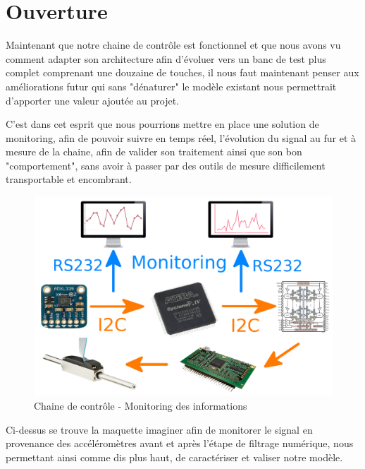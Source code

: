 \documentclass[french,a4paper,12pt]{report}
\begin{document}
		\section{Ouverture}
		
		Maintenant que notre chaine de contrôle est fonctionnel et que nous avons vu comment adapter son architecture afin d'évoluer vers un banc de test plus complet comprenant une douzaine de touches, il nous faut maintenant penser aux améliorations futur qui sans "dénaturer" le modèle existant nous permettrait d'apporter une valeur ajoutée au projet.
		
		C'est dans cet esprit que nous pourrions mettre en place une solution de monitoring, afin de pouvoir suivre en temps réel, l'évolution du signal au fur et à mesure de la chaine, afin de valider son traitement ainsi que son bon "comportement", sans avoir à passer par des outils de mesure difficilement transportable et encombrant.
		
	\begin{figure}[!ht]
    \center
  	\includegraphics[width=12cm]{CH&MO.png}
		\caption{Chaine de contrôle - Monitoring des informations}
	\end{figure}
		
	Ci-dessus se trouve la maquette imaginer afin de monitorer le signal en provenance des accéléromètres avant et après l'étape de filtrage numérique, nous permettant ainsi comme dis plus haut, de caractériser et valiser notre modèle.



%
%
\end{document}
